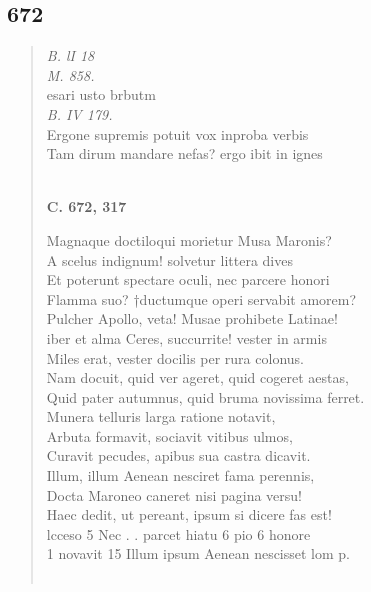 \documentclass[11pt, a4paper]{report}
\begin{document}
            \subsection*{672}
      \begin{verse}
      \textit{B. lI 18} \\ \textit{M. 858.} \\ esari usto brbutm \\ \textit{B. IV 179.} \\ Ergone supremis potuit vox inproba verbis \\ Tam dirum mandare nefas? ergo ibit in ignes \\ 
        ﻿\pagebreak 
     \marginpar{[146]} \begin{center} \textbf{C. 672, 317} \end{center}Magnaque doctiloqui morietur Musa Maronis? \\ A scelus indignum! solvetur littera dives \\ Et poterunt spectare oculi, nec parcere honori \\ Flamma suo? †ductumque operi servabit amorem? \\ Pulcher Apollo, veta! Musae prohibete Latinae! \\ iber et alma Ceres, succurrite! vester in armis \\ Miles erat, vester docilis per rura colonus. \\ Nam docuit, quid ver ageret, quid cogeret aestas, \\ Quid pater autumnus, quid bruma novissima ferret. \\ Munera telluris larga ratione notavit, \\ Arbuta formavit, sociavit vitibus ulmos, \\ Curavit pecudes, apibus sua castra dicavit. \\ Illum, illum Aenean nesciret fama perennis, \\ Docta Maroneo caneret nisi pagina versu! \\ Haec dedit, ut pereant, ipsum si dicere fas est! \\ lcceso 5 Nec . . parcet hiatu 6 pio 6 honore \\ 1 novavit 15 Illum ipsum Aenean nescisset lom p. \\ 
        ﻿\pagebreak 

\end{verse}
\end{document}
